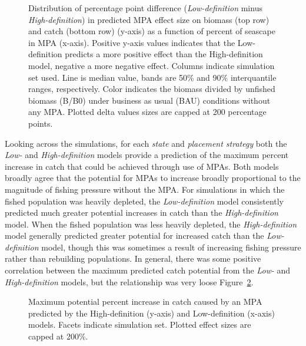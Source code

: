 \documentclass[
  default,
  lineno,
  referee]{sn-jnl}
\begin{document}
\begin{figure}


\caption{\label{fig-delta}Distribution of percentage point difference
(\emph{Low-definition} minus \emph{High-definition}) in predicted MPA
effect size on biomass (top row) and catch (bottom row) (y-axis) as a
function of percent of seascape in MPA (x-axis). Positive y-axis values
indicates that the Low-definition predicts a more positive effect than
the High-definition model, negative a more negative effect. Columns
indicate simulation set used. Line is median value, bands are 50\% and
90\% interquantile ranges, respectively. Color indicates the biomass
divided by unfished biomass (B/B0) under business as usual (BAU)
conditions without any MPA. Plotted delta values sizes are capped at 200
percentage points.}

\end{figure}%

Looking across the simulations, for each \emph{state} and
\emph{placement strategy} both the \emph{Low-} and
\emph{High-definition} models provide a prediction of the maximum
percent increase in catch that could be achieved through use of MPAs.
Both models broadly agree that the potential for MPAs to increase
broadly proportional to the magnitude of fishing pressure without the
MPA. For simulations in which the fished population was heavily
depleted, the \emph{Low-definition} model consistently predicted much
greater potential increases in catch than the \emph{High-definition}
model. When the fished population was less heavily depleted, the
\emph{High-definition} model generally predicted greater potential for
increased catch than the \emph{Low-definition} model, though this was
sometimes a result of increasing fishing pressure rather than rebuilding
populations. In general, there was some positive correlation between the
maximum predicted catch potential from the \emph{Low-} and
\emph{High-definition} models, but the relationship was very loose
Figure~\ref{fig-max-catch}.

\begin{figure}


\caption{\label{fig-max-catch}Maximum potential percent increase in
catch caused by an MPA predicted by the High-definition (y-axis) and
Low-definition (x-axis) models. Facets indicate simulation set. Plotted
effect sizes are capped at 200\%.}

\end{figure}%
\end{document}

